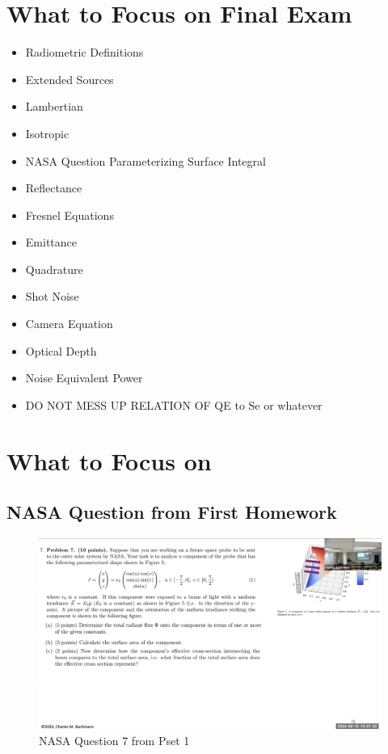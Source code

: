 \documentclass{article}
\begin{document}
\section{What to Focus on Final Exam}
\begin{itemize}
    \item Radiometric Definitions
    \item Extended Sources
    \item Lambertian 
    \item Isotropic 
    \item NASA Question Parameterizing Surface Integral
    \item Reflectance
    \item Fresnel Equations 
    \item Emittance 
    \item Quadrature
    \item Shot Noise 
    \item Camera Equation 
    \item Optical Depth 
    \item Noise Equivalent Power 
    \item DO NOT MESS UP RELATION OF QE to Se or whatever
    
\end{itemize}

\section{What to Focus on}

\clearpage
\subsection{NASA Question from First Homework}

\begin{figure}[h!]
\centering
\includegraphics[scale=.4]{Radiometry/Crux/Num1.png}
\caption{NASA Question 7 from Pset 1}
\label{fig:NASA Question}
\end{figure}
\end{document}
